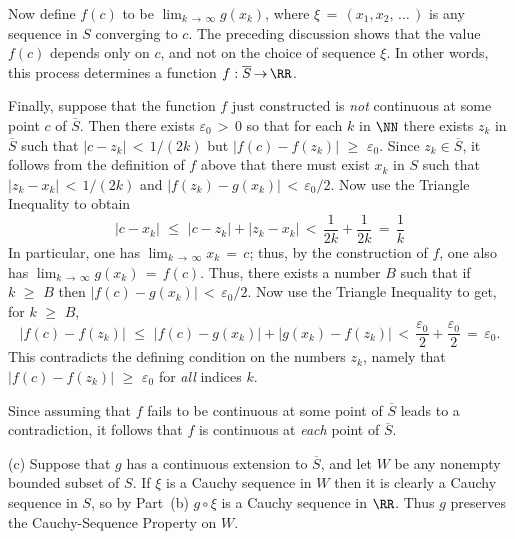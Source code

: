         Now define $f(c)$ to be $\lim_{k \,{\rightarrow}\, {\infty}} g(x_{k})$, where ${\xi} \,=\, (x_{1},x_{2},\,{\ldots}\,)$ is any sequence in $S$ converging to $c$.
    The preceding discussion shows that the value $f(c)$ depends only on $c$, and not on the choice of sequence ${\xi}$.
    In other words, this process determines a function $f:\overline{S} \,{\rightarrow}\, {\RR}$.

        Finally, suppose that the function $f$ just constructed is {\em not} continuous at some point $c$ of $\overline{S}$.
    Then there exists ${\varepsilon}_{0}\,>\,0$ so that for each $k$ in ${\NN}$ there exists $z_{k}$ in $\overline{S}$ such that $|c-z_{k}|\,<\,1/(2k)$ but $|f(c)-f(z_{k})|\,\,{\geq}\,\,{\varepsilon}_{0}$.
    Since $z_{k}{\in}\overline{S}$, it follows from the definition of $f$ above that there must exist $x_{k}$ in $S$ such that $|z_{k}-x_{k}|\,<\,1/(2k)$ and $|f(z_{k})-g(x_{k})|\,<\,{\varepsilon}_{0}/2$.
    Now use the Triangle Inequality to obtain
        \begin{displaymath}
        |c-x_{k}|\,\,{\leq}\,\,|c-z_{k}| + |z_{k}-x_{k}|\,<\,\frac{1}{2k} + \frac{1}{2k} \,=\, \frac{1}{k}
        \end{displaymath}
    In particular, one has $\lim_{k \,{\rightarrow}\, {\infty}} x_{k} \,=\, c$; thus, by the construction of $f$, one also has $\lim_{k \,{\rightarrow}\, {\infty}} g(x_{k}) \,=\, f(c)$.
    Thus, there exists a number $B$ such that if $k\,\,{\geq}\,\,B$ then $|f(c)-g(x_{k})|\,<\,{\varepsilon}_{0}/2$.
    Now use the Triangle Inequality to get, for $k\,\,{\geq}\,\,B$,
        \begin{displaymath}
        |f(c)-f(z_{k})|\,\,{\leq}\,\,|f(c)-g(x_{k})| + |g(x_{k})-f(z_{k})|\,<\,
    \frac{{\varepsilon}_{0}}{2} + \frac{{\varepsilon}_{0}}{2} \,=\, {\varepsilon}_{0}.
        \end{displaymath}
    This contradicts the defining condition on the numbers $z_{k}$, namely that $|f(c)-f(z_{k})|\,\,{\geq}\,\,{\varepsilon}_{0}$ for {\em all} indices $k$.

    Since assuming that $f$ fails to be continuous at some point of $\overline{S}$ leads to a contradiction, it follows that $f$ is continuous at {\em each} point of $\overline{S}$.

\V

        (c) Suppose that $g$ has a continuous extension to $\overline{S}$, and let $W$ be any nonempty bounded subset of $S$.
    If ${\xi}$ is a Cauchy sequence in $W$ then it is clearly a Cauchy sequence in $S$, so by Part~(b) $g{\circ}{\xi}$ is a Cauchy sequence in ${\RR}$.
    Thus $g$ preserves the Cauchy-Sequence Property on $W$.

